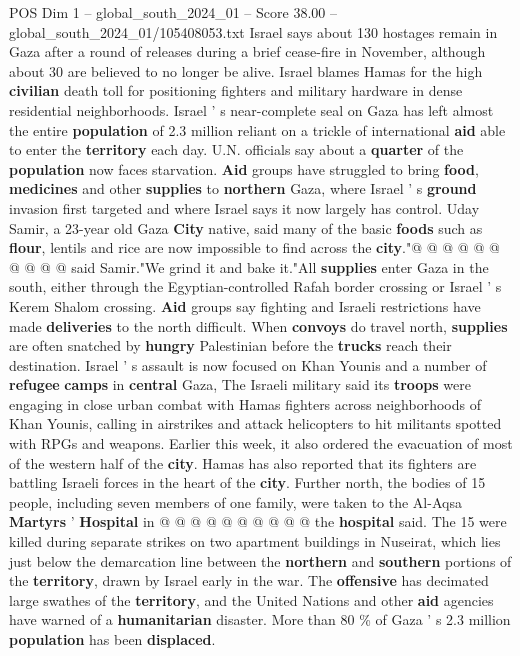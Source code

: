 \begin{textsample}{POS Dim 1 – global\_south\_2024\_01 – Score 38.00 – global\_south\_2024\_01/105408053.txt}
Israel says about 130 hostages remain in Gaza after a round of releases during a brief cease-fire in November, although about 30 are believed to no longer be alive.
Israel blames Hamas for the high \textbf{civilian} death toll for positioning fighters and military hardware in dense residential neighborhoods.
Israel ' s near-complete seal on Gaza has left almost the entire \textbf{population} of 2.3 million reliant on a trickle of international \textbf{aid} able to enter the \textbf{territory} each day.
U.N. officials say about a \textbf{quarter} of the \textbf{population} now faces starvation. \textbf{Aid} groups have struggled to bring \textbf{food}, \textbf{medicines} and other \textbf{supplies} to \textbf{northern} Gaza, where Israel ' s \textbf{ground} invasion first targeted and where Israel says it now largely has control.
Uday Samir, a 23-year old Gaza \textbf{City} native, said many of the basic \textbf{foods} such as \textbf{flour}, lentils and rice are now impossible to find across the \textbf{city}."@ @ @ @ @ @ @ @ @ @ said Samir."We grind it and bake it."All \textbf{supplies} enter Gaza in the south, either through the Egyptian-controlled Rafah border crossing or Israel ' s Kerem Shalom crossing. \textbf{Aid} groups say fighting and Israeli restrictions have made \textbf{deliveries} to the north difficult.
When \textbf{convoys} do travel north, \textbf{supplies} are often snatched by \textbf{hungry} Palestinian before the \textbf{trucks} reach their destination.
Israel ' s assault is now focused on Khan Younis and a number of \textbf{refugee} \textbf{camps} in \textbf{central} Gaza, The Israeli military said its \textbf{troops} were engaging in close urban combat with Hamas fighters across neighborhoods of Khan Younis, calling in airstrikes and attack helicopters to hit militants spotted with RPGs and weapons.
Earlier this week, it also ordered the evacuation of most of the western half of the \textbf{city}.
Hamas has also reported that its fighters are battling Israeli forces in the heart of the \textbf{city}.
Further north, the bodies of 15 people, including seven members of one family, were taken to the Al-Aqsa \textbf{Martyrs} ' \textbf{Hospital} in @ @ @ @ @ @ @ @ @ @ the \textbf{hospital} said.
The 15 were killed during separate strikes on two apartment buildings in Nuseirat, which lies just below the demarcation line between the \textbf{northern} and \textbf{southern} portions of the \textbf{territory}, drawn by Israel early in the war.
The \textbf{offensive} has decimated large swathes of the \textbf{territory}, and the United Nations and other \textbf{aid} agencies have warned of a \textbf{humanitarian} disaster.
More than 80 \% of Gaza ' s 2.3 million \textbf{population} has been \textbf{displaced}.

\end{textsample}
